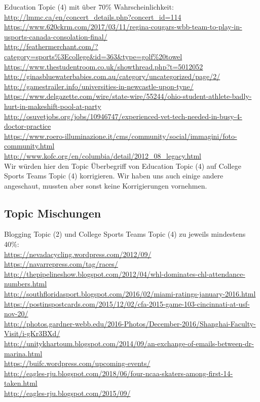 Education Topic (4) mit über 70\% Wahrscheinlichkeit: \\

{\color{MidnightBlue}
\noindent\url{http://lmmc.ca/en/concert_details.php?concert_id=114} \\
\url{https://www.620ckrm.com/2017/03/11/regina-cougars-wbb-team-to-play-in-usports-canada-consolation-final/} \\
\url{http://feathermerchant.com/?category=sports%3Ecollege&id=363&type=golf%20towel} \\
\url{https://www.thestudentroom.co.uk/showthread.php?t=5012052} \\
\url{http://ginasbluewaterbabies.com.au/category/uncategorized/page/2/} \\
\url{http://gamestrailer.info/universities-in-newcastle-upon-tyne/} \\
\url{https://www.delgazette.com/wire/state-wire/55244/ohio-student-athlete-badly-hurt-in-makeshift-pool-at-party} \\
\url{http://osuvetjobs.org/jobs/10946747/experienced-vet-tech-needed-in-busy-4-doctor-practice} \\
\url{https://www.roero-illuminazione.it/cms/community/social/immagini/foto-community.html} \\
\url{http://www.kofc.org/en/columbia/detail/2012_08_legacy.html}} \\

\noindent Wir würden hier den Topic Überbegriff von Education Topic (4) auf College Sports Teams Topic (4) korrigieren. Wir haben uns auch einige andere angeschaut, mussten aber sonst keine Korrigierungen vornehmen.

\subsection{Topic Mischungen}

Blogging Topic (2) und College Sports Teams Topic (4) zu jeweils mindestens 40\%: \\

{\color{MidnightBlue}
\noindent\url{https://nevadacycling.wordpress.com/2012/09/} \\
\url{https://navarrepress.com/tag/races/} \\
\url{http://thepipelineshow.blogspot.com/2012/04/whl-dominates-chl-attendance-numbers.html} \\
\url{http://southfloridasport.blogspot.com/2016/02/miami-ratings-january-2016.html} \\
\url{https://postinspostcards.com/2015/12/02/cfa-2015-game-103-cincinnati-at-usf-nov-20/} \\
\url{http://photos.gardner-webb.edu/2016-Photos/December-2016/Shanghai-Faculty-Visit/i-gKr3BXd/} \\
\url{http://unitykhartoum.blogspot.com/2014/09/an-exchange-of-emails-between-dr-marina.html} \\
\url{https://buifc.wordpress.com/upcoming-events/} \\
\url{http://eagles-rju.blogspot.com/2018/06/four-ncaa-skaters-among-first-14-taken.html} \\
\url{http://eagles-rju.blogspot.com/2015/09/}} \\

